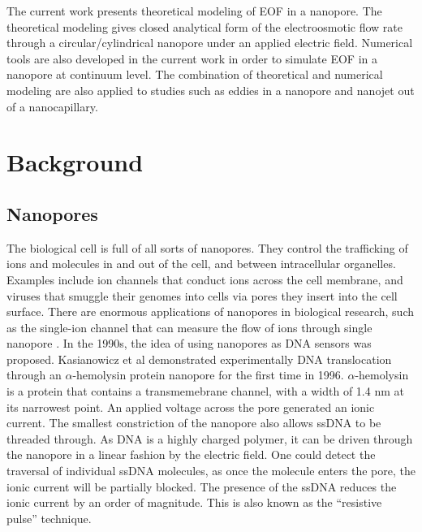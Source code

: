 The current work presents theoretical modeling of EOF in a nanopore. The theoretical modeling gives closed analytical form of the electroosmotic flow rate through a circular\//cylindrical nanopore under an applied electric field. Numerical tools are also developed in the current work in order to simulate EOF in a nanopore at continuum level. The combination of theoretical and numerical modeling are also applied to studies such as eddies in a nanopore and nanojet out of a nanocapillary.

\section{Background}\label{intro-bkg}
\subsection{Nanopores}
The biological cell is full of all sorts of nanopores. They control the trafficking of ions and molecules in and out of the cell, and between intracellular organelles. Examples include ion channels that conduct ions across the cell membrane, and viruses that smuggle their genomes into cells via pores they insert into the cell surface. There are enormous applications of nanopores in biological research, such as the single-ion channel that can measure the flow of ions through single nanopore \cite{sakmann1983single}. In the 1990s, the idea of using nanopores as DNA sensors was proposed. Kasianowicz \cite{Kasianowicz1996} et al demonstrated experimentally DNA translocation through an $\alpha$-hemolysin protein nanopore for the first time in 1996. $\alpha$-hemolysin is a protein that contains a transmemebrane channel, with a width of 1.4 nm at its narrowest point. An applied voltage across the pore generated an ionic current. The smallest constriction of the nanopore also allows ssDNA to be threaded through. As DNA is a highly charged polymer, it can be driven through the nanopore in a linear fashion by the electric field. One could detect the traversal of individual ssDNA molecules, as once the molecule enters the pore, the ionic current will be partially blocked. The presence of the ssDNA reduces the ionic current by an order of magnitude. This is also known as the ``resistive pulse'' technique.

